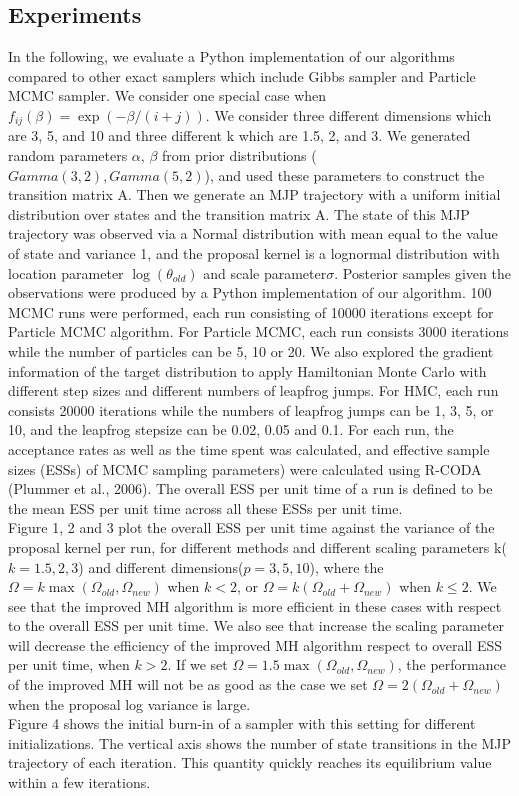 \subsection{Experiments}
In the following, we evaluate a Python implementation of our algorithms compared to other exact samplers which include Gibbs sampler and Particle MCMC sampler. We consider one special case when $f_{ij}(\beta) = \exp(-\beta / (i + j))$. We consider three different dimensions which are 3, 5, and 10 and three different k which are 1.5, 2, and 3. We generated random parameters $\alpha$, $\beta$ from prior distributions ($Gamma(3,2), Gamma(5, 2)$), and used these parameters to construct the transition matrix A. Then we generate an MJP trajectory with a uniform initial distribution over states and the transition matrix A. The state of this MJP trajectory was observed via a Normal distribution with mean equal to the value of state and variance 1, and the proposal kernel is a lognormal distribution with location parameter $\log(\theta_{old})$ and scale parameter$\sigma$. Posterior samples given the observations were produced by a Python implementation of our algorithm. 100 MCMC runs were performed, each run consisting of 10000 iterations except for Particle MCMC algorithm. For Particle MCMC, each run consists 3000 iterations while the number of particles can be 5, 10 or 20. We also explored the gradient information of the target distribution to apply Hamiltonian Monte Carlo with different step sizes and different numbers of leapfrog jumps. For HMC,  each run consists 20000 iterations while the numbers of leapfrog jumps can be 1, 3, 5, or 10, and the leapfrog stepsize can be  0.02, 0.05 and 0.1. For each run, the acceptance rates as well as the time spent was calculated, and effective sample sizes (ESSs) of MCMC sampling parameters) were calculated using R-CODA (Plummer et al., 2006). The overall ESS per unit time of a run is defined to be the mean ESS per unit time across all these ESSs per unit time.\\
Figure 1, 2 and 3 plot the overall  ESS per unit time against the variance of the proposal kernel per run, for different methods and different scaling parameters k($k = 1.5, 2, 3$) and different dimensions($p = 3, 5, 10$), where the  $\Omega = k \max(\Omega_{old}, \Omega_{new})$ when $k < 2$, or $\Omega = k (\Omega_{old} + \Omega_{new})$ when $k \leq 2$. We see that the improved MH algorithm is more efficient in these cases with respect to the overall ESS per unit time. We also see that increase the scaling parameter will decrease the efficiency of the improved MH algorithm respect to overall ESS per unit time, when $k > 2$. If we set $\Omega = 1.5 \max(\Omega_{old}, \Omega_{new})$, the performance of the improved MH will not be as good as the case we set $\Omega = 2(\Omega_{old} + \Omega_{new})$ when the proposal log variance is large.\\
Figure 4 shows the initial burn-in of a sampler with this setting for different initializations. The vertical axis shows the number of state transitions in the MJP trajectory of each iteration. This quantity quickly reaches its equilibrium value within a few iterations.\\

